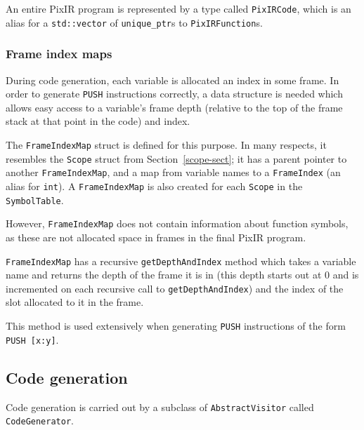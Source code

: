 \documentclass[11pt,a4paper]{scrartcl}
\begin{document}
An entire PixIR program is represented by a type called \verb|PixIRCode|, which is an alias for a \verb|std::vector| of \verb|unique_ptr|s to \verb|PixIRFunction|s.

\subsubsection{Frame index maps}

During code generation, each variable is allocated an index in some frame. In order to generate \verb|PUSH| instructions correctly, a data structure is needed which allows easy access to a variable's frame depth (relative to the top of the frame stack at that point in the code) and index.

The \verb|FrameIndexMap| struct is defined for this purpose. In many respects, it resembles the \verb|Scope| struct from Section~\ref{scope-sect}; it has a parent pointer to another \verb|FrameIndexMap|, and a map from variable names to a \verb|FrameIndex| (an alias for \verb|int|). A \verb|FrameIndexMap| is also created for each \verb|Scope| in the \verb|SymbolTable|.

However, \verb|FrameIndexMap| does not contain information about function symbols, as these are not allocated space in frames in the final PixIR program.

\verb|FrameIndexMap| has a recursive \verb|getDepthAndIndex| method which takes a variable name and returns the depth of the frame it is in (this depth starts out at $0$ and is incremented on each recursive call to \verb|getDepthAndIndex|) and the index of the slot allocated to it in the frame.

This method is used extensively when generating \verb|PUSH| instructions of the form \verb|PUSH [x:y]|.

\subsection{Code generation}

Code generation is carried out by a subclass of \verb|AbstractVisitor| called \verb|CodeGenerator|.
\end{document}

